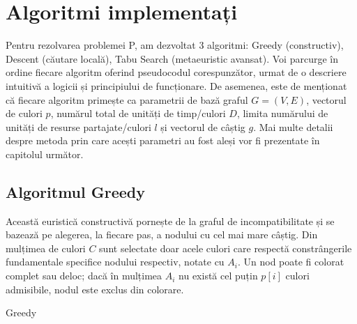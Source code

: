 \chapter{Algoritmi implementați}\label{cap:algoritmi}

   Pentru rezolvarea problemei P, am dezvoltat 3 algoritmi: Greedy (constructiv), Descent (căutare locală), Tabu Search (metaeuristic avansat). Voi parcurge în ordine fiecare algoritm oferind pseudocodul corespunzător, urmat de o descriere intuitivă a logicii și principiului de funcționare. De asemenea, este de menționat că fiecare algoritm primește ca parametrii de bază graful $G=(V,E)$, vectorul de culori $p$, numărul total de unități de timp/culori $D$, limita numărului de unități de resurse partajate/culori $l$ și vectorul de câștig $g$. Mai multe detalii despre metoda prin care acești parametri au fost aleși vor fi prezentate în capitolul următor.


\section{Algoritmul Greedy}

Această euristică constructivă pornește de la graful de incompatibilitate și se bazează pe alegerea, la fiecare pas, a nodului cu cel mai mare câștig. Din mulțimea de culori $C$ sunt selectate doar acele culori care respectă constrângerile fundamentale specifice nodului respectiv, notate cu $A_i$. Un nod poate fi colorat complet sau deloc; dacă în mulțimea $A_i$ nu există cel puțin $p[i]$ culori admisibile, nodul este exclus din colorare.

\begin{algorithm}[H] 
\caption{Greedy}\label{alg:greedy_multicoloring} 
\begin{algorithmic}[1] 
\small
{}
    \EndIf{}     
    \Else{}         
    \EndIf{}
\EndWhile{}

\end{algorithmic} 
\end{algorithm}


